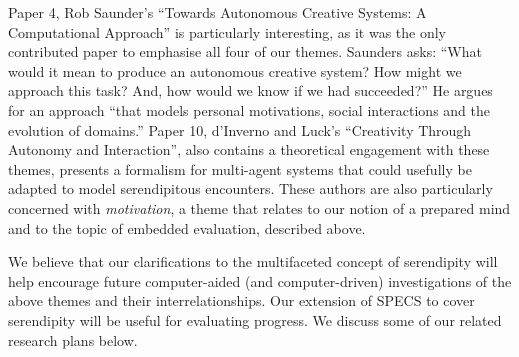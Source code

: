 \medskip



\bigskip

Paper 4, Rob Saunder's \citeyear{saunders2012towards} ``Towards
Autonomous Creative Systems: A Computational Approach'' is
particularly interesting, as it was the only contributed paper to
emphasise all four of our themes.  Saunders asks: ``What would it mean
to produce an autonomous creative system? How might we approach this
task? And, how would we know if we had succeeded?''  He argues for an
approach ``that models personal motivations, social interactions and
the evolution of domains.''  Paper 10, d'Inverno and Luck's
\citeyear{d2012creativity} ``Creativity Through Autonomy and
Interaction'', also contains a theoretical engagement with these
themes, presents a formalism for multi-agent systems that could
usefully be adapted to model serendipitous encounters.  These authors
are also particularly concerned with \emph{motivation}, a theme that
relates to our notion of a prepared mind and to the topic of embedded
evaluation, described above.

We believe that our clarifications to the multifaceted concept of
serendipity will help encourage future computer-aided (and
computer-driven) investigations of the above themes and their
interrelationships.  Our extension of SPECS to cover serendipity will
be useful for evaluating progress.  We discuss some of our related
research plans below.
